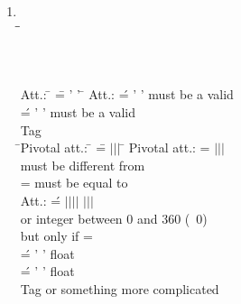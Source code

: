 \begin{enumerate}
\item  {}

\begin{tabbing}
\\[\taglnskp]
\tagindent{}\tagsp \= \oneocc \= \opt \kill
\tagindent{} \>\oneocc \>\opt \\[\taglnskp]
\tagindent{}   \>\oneocc \>\opt\\[\taglnskp]
\tagindent{}         \>\oneocc \>\req  \\[\taglnskp]
\end{tabbing}

\begin{tabbing}
\ptn Att.: \=   \== ' ' \tagsp  \= \strng   \opt \kill
\ptn Att.: \>\>   \' = ' '  \> \strng   \req   must be
a valid \\
           \>\>   \' = ' '  \> \strng   \req   must be
           a valid \\[.7ex]
\ptn Tag  \\[.5ex]
\pushtabs
\tagindent\= \ptn Pivotal att.: \=  \==
$|$$|$$|$ \tagsp\= \token  \req  \kill
\> \ptn Pivotal att.: \> \>=
$|$$|$$|$
\> \token  \req\\
\>\>\>\tagsp{} must be different from \\
             \>\> \> =   \tagsp
              must be equal to   \\[.5ex]

\>   \ptn Att.: \>\>\' =
$|$$|$$|$$|$%
$|$$|$$|$
\token \req  \\
\>\>\>\tagsp or integer between 0 and 360   (~0) \\
\>\>\>\tagsp but only if   = \\
\>\>\> \'= ' '   float   \opt\\
\>\>\> \'= ' '   float    \opt\\[.7ex]

\poptabs
\ptn Tag   or something more complicated
\end{tabbing}



\end{enumerate}
